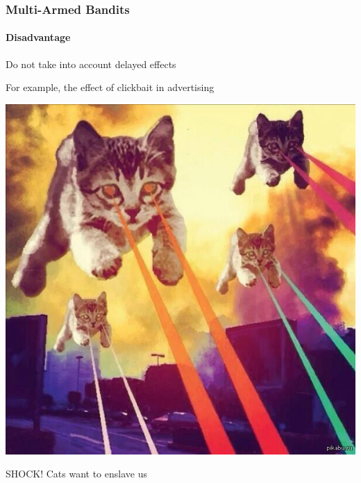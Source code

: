 \documentclass[fullscreen=true, bookmarks=true, hyperref={pdfencoding=unicode}]{beamer}
\begin{document}
\begin{frame}
  \frametitle{Multi-Armed Bandits}
    \framesubtitle{Disadvantage}

   Do not take into account delayed effects

   For example, the effect of clickbait in advertising

   \pause
   \begin{center}
     \includegraphics[keepaspectratio,
                      width=.45\paperwidth]{cats_invaders.jpg}

     SHOCK! Cats want to enslave us
   \end{center}
\end{frame}

\end{document}
